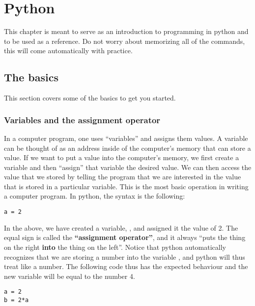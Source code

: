 \chapter{Python}
This chapter is meant to serve as an introduction to programming in python and to be used as a reference. Do not worry about memorizing all of the commands, this will come automatically with practice.

\section{The basics}
This section covers some of the basics to get you started.
\subsection{Variables and the assignment operator}
In a computer program, one uses ``variables'' and assigns them values. A variable can be thought of as an address inside of the computer's memory that can store a value. If we want to put a value into the computer's memory, we first create a variable and then ``assign'' that variable the desired value. We can then access the value that we stored by telling the program that we are interested in the value that is stored in a particular variable. This is the most basic operation in writing a computer program. In python, the syntax is the following:
\begin{lstlisting}[frame=single] 
a = 2 
\end{lstlisting}

In the above, we have created a variable, , and assigned it the value of 2. The equal sign is called the \textbf{``assignment operator''}, and it always ``puts the thing on the right \textbf{into} the thing on the left''. Notice that python automatically recognizes that we are storing a number into the variable , and python will thus treat  like a number. The following code thus has the expected behaviour and the new variable  will be equal to the number 4.

\begin{lstlisting}[frame=single] 
a = 2 
b = 2*a
\end{lstlisting}


